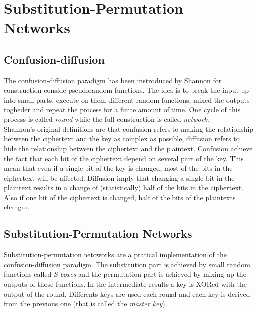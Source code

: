 \section{Substitution-Permutation Networks}
\subsection{Confusion-diffusion}
The confusion-diffusion paradigm has been instroduced by Shannon for construction conside pseudorandom functions. The idea is to break the input up into small parts, execute on them different random functions, mixed the outputs togheder and repeat the process for a finite amount of time. One cycle of this process is called \emph{round} while the full construction is called \emph{network}.\\
Shannon's original definitions are that confusion refers to making the relationship between the ciphertext and the key as complex as possible, diffusion refers to hide the relationship between the ciphertext and the plaintext.
Confusion achieve the fact that each bit of the ciphertext depend on several part of the key. This mean that even if a single bit of the key is changed, most of the bits in the ciphertext will be affected.
Diffusion imply that changing a single bit in the plaintext results in a change of (statistically) half of the bits in the ciphertext. Also if one bit of the ciphertext is changed, half of the bits of the plaintexts changes.

\subsection{Substitution-Permutation Networks}
Substitution-permutation netoworks are a pratical implementation of the confusion-diffusion paradigm. The substitution part is achieved by small random functions called \emph{S-boxes} and the permutation part is achieved by mixing up the outputs of those functions. In the intermediate results a key is XORed with the output of the round. Differents keys are used each round and each key is derived from the previous one (that is called the \emph{master key}).
